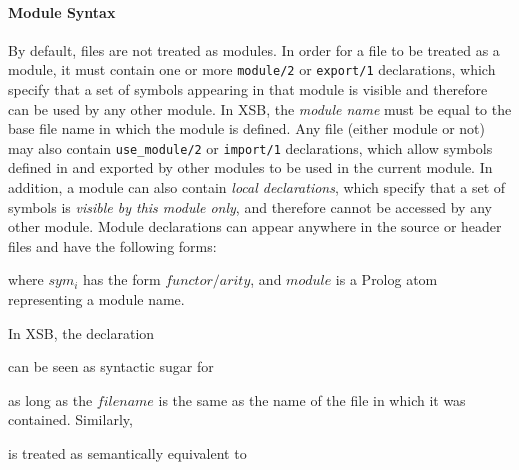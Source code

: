 \paragraph*{Module Syntax}
%
By default, files are not treated as modules.  In order for a file to
be treated as a module, it must contain one or more {\tt module/2} or
{\tt export/1} declarations, which specify that a set of symbols
appearing in that module is visible and therefore can be used by any
other module.  In XSB, the {\em module name} must be equal to the base
file name in which the module is defined.  Any file (either module or
not) may also contain {\tt use\_module/2} or {\tt import/1}
declarations, which allow symbols defined in and exported by other
modules to be used in the current module.  In addition, a module can
also contain {\it local declarations}, which specify that a set of
symbols is {\it visible by this module only}, and therefore cannot be
accessed by any other module.  Module declarations can appear anywhere
in the source or header files and have the following forms:

 
  
      





\noindent
where $sym_i$ has the form $functor/arity$, and $module$ is a Prolog
atom representing a module name.

In XSB, the declaration


\noindent
can be seen as syntactic sugar for 


\noindent
as long as the $filename$ is the same as the name of the file in which
it was contained.  Similarly,


\noindent
is treated as semantically equivalent to 

